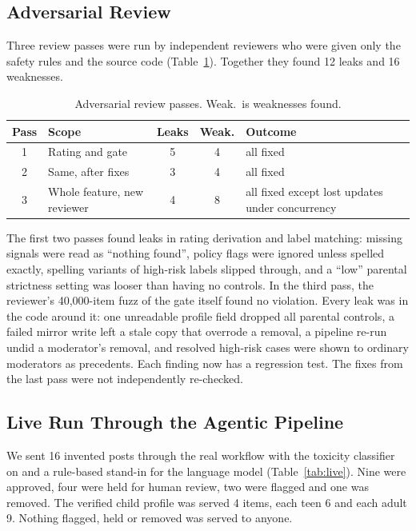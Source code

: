 \documentclass[conference]{IEEEtran}
\begin{document}
\subsection{Adversarial Review}

Three review passes were run by independent reviewers who were given only the safety rules and the source code (Table~\ref{tab:review}). Together they found 12 leaks and 16 weaknesses.

\begin{table}[t]
\caption{Adversarial review passes. Weak.\ is weaknesses found.}
\label{tab:review}
\centering
\footnotesize
\begin{tabular}{@{}cp{}ccp{}@{}}
\toprule
Pass & Scope & Leaks & Weak. & Outcome \\
\midrule
1 & Rating and gate & 5 & 4 & all fixed \\
2 & Same, after fixes & 3 & 4 & all fixed \\
3 & Whole feature, new reviewer & 4 & 8 & all fixed except lost updates under concurrency \\
\bottomrule
\end{tabular}
\end{table}

The first two passes found leaks in rating derivation and label matching: missing signals were read as ``nothing found'', policy flags were ignored unless spelled exactly, spelling variants of high-risk labels slipped through, and a ``low'' parental strictness setting was looser than having no controls. In the third pass, the reviewer's 40,000-item fuzz of the gate itself found no violation. Every leak was in the code around it: one unreadable profile field dropped all parental controls, a failed mirror write left a stale copy that overrode a removal, a pipeline re-run undid a moderator's removal, and resolved high-risk cases were shown to ordinary moderators as precedents. Each finding now has a regression test. The fixes from the last pass were not independently re-checked.

\subsection{Live Run Through the Agentic Pipeline}

We sent 16 invented posts through the real workflow with the toxicity classifier on and a rule-based stand-in for the language model (Table~\ref{tab:live}). Nine were approved, four were held for human review, two were flagged and one was removed. The verified child profile was served 4 items, each teen 6 and each adult 9. Nothing flagged, held or removed was served to anyone.
\end{document}
